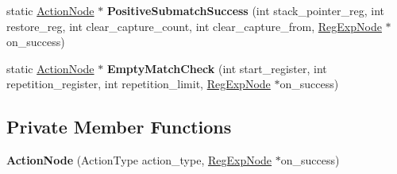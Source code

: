 \begin{DoxyCompactItemize}
\item 
static \hyperlink{classv8_1_1internal_1_1_action_node}{Action\+Node} $\ast$ {\bfseries Positive\+Submatch\+Success} (int stack\+\_\+pointer\+\_\+reg, int restore\+\_\+reg, int clear\+\_\+capture\+\_\+count, int clear\+\_\+capture\+\_\+from, \hyperlink{classv8_1_1internal_1_1_reg_exp_node}{Reg\+Exp\+Node} $\ast$on\+\_\+success)\hypertarget{classv8_1_1internal_1_1_action_node_a89bed32eadb39ad776f7e5523d8d152b}{}\label{classv8_1_1internal_1_1_action_node_a89bed32eadb39ad776f7e5523d8d152b}

\item 
static \hyperlink{classv8_1_1internal_1_1_action_node}{Action\+Node} $\ast$ {\bfseries Empty\+Match\+Check} (int start\+\_\+register, int repetition\+\_\+register, int repetition\+\_\+limit, \hyperlink{classv8_1_1internal_1_1_reg_exp_node}{Reg\+Exp\+Node} $\ast$on\+\_\+success)\hypertarget{classv8_1_1internal_1_1_action_node_a1f8492811dde72cce77b5b7f8d083292}{}\label{classv8_1_1internal_1_1_action_node_a1f8492811dde72cce77b5b7f8d083292}

\end{DoxyCompactItemize}
\subsection*{Private Member Functions}
\begin{DoxyCompactItemize}
\item 
{\bfseries Action\+Node} (Action\+Type action\+\_\+type, \hyperlink{classv8_1_1internal_1_1_reg_exp_node}{Reg\+Exp\+Node} $\ast$on\+\_\+success)\hypertarget{classv8_1_1internal_1_1_action_node_a4e387d38254ec87a46dd1cdb983607bf}{}\label{classv8_1_1internal_1_1_action_node_a4e387d38254ec87a46dd1cdb983607bf}

\end{DoxyCompactItemize}
